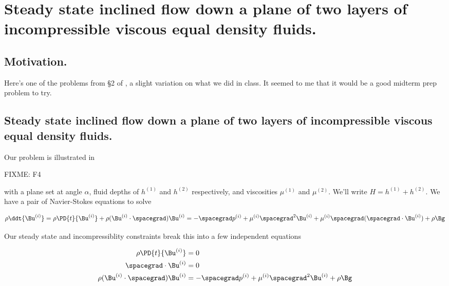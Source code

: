 
%


\chapter{Steady state inclined flow down a plane of two layers of incompressible viscous equal density fluids.}
\label{chap:twoLayerInclinedFlow}
{}
\date{Mar 1, 2012}

\beginArtWithToc

\section{Motivation.}

Here's one of the problems from \S 2 of \cite{acheson1990elementary}, a slight variation on what we did in class.  It seemed to me that it would be a good midterm prep problem to try.

\section{Steady state inclined flow down a plane of two layers of incompressible viscous equal density fluids.}

Our problem is illustrated in 

FIXME: F4

with a plane set at angle $\alpha$, fluid depths of $h^{(1)}$ and $h^{(2)}$ respectively, and viscosities $\mu^{(1)}$ and $\mu^{(2)}$.  We'll write $H = h^{(1)} + h^{(2)}$.  We have a pair of Navier-Stokes equations to solve

\begin{equation}\label{eqn:twoLayerInclinedFlow:n}
\rho \ddt{\Bu^{(i)}} = \rho \PD{t}{\Bu^{(i)}} + \rho (\Bu^{(i)} \cdot \spacegrad) \Bu^{(i)} = - \spacegrad p^{(i)} + \mu^{(i)} \spacegrad^2 \Bu^{(i)} + \mu^{(i)} \spacegrad (\spacegrad \cdot \Bu^{(i)}) + \rho \Bg
\end{equation}

Our steady state and incompressiblity constraints break this into a few independent equations

\begin{align}\label{eqn:twoLayerInclinedFlow:n}
\rho \PD{t}{\Bu^{(i)}} &= 0 \\
\spacegrad \cdot \Bu^{(i)} &= 0 \\
\rho (\Bu^{(i)} \cdot \spacegrad) \Bu^{(i)} &= - \spacegrad p^{(i)} + \mu^{(i)} \spacegrad^2 \Bu^{(i)} + \rho \Bg
\end{align}

